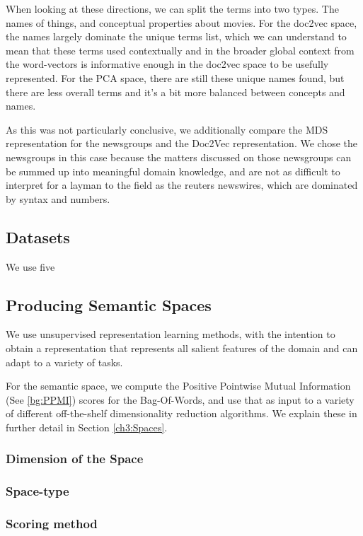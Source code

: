 When looking at these directions, we can split the terms into two types. The names of things, and conceptual properties about movies. For the doc2vec space, the names largely dominate the unique terms list, which we can understand to mean that these terms used contextually and in the broader global context from the word-vectors is informative enough in the doc2vec space to be usefully represented. For the PCA space, there are still these unique names found, but there are less overall terms and it's a bit more balanced between concepts and names. 

As this was not particularly conclusive, we additionally compare the MDS representation for the newsgroups and the Doc2Vec representation. We chose the newsgroups in this case because the matters discussed on those newsgroups can be summed up into meaningful domain knowledge, and are not as difficult to interpret for a layman to the field as the reuters newswires, which are dominated by syntax and numbers. 

\subsection{Datasets}

We use five 

\subsection{Producing Semantic Spaces}

We use unsupervised representation learning methods, with the intention to obtain a representation that represents all salient features of the domain and can adapt to a variety of tasks. 

For the semantic space, we compute the Positive Pointwise Mutual Information (See \ref{bg:PPMI}) scores for the Bag-Of-Words, and use that as input to a variety of different off-the-shelf dimensionality reduction algorithms. We explain these in further detail in Section \ref{ch3:Spaces}. 

\subsubsection{Dimension of the Space}

\subsubsection{Space-type}

\subsubsection{Scoring method}

